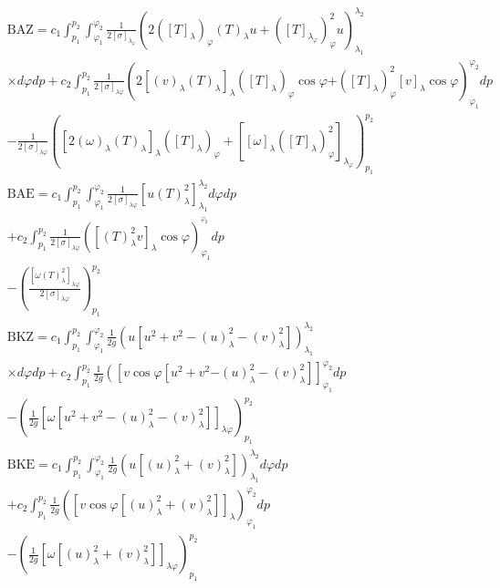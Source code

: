 \begin{align}
& \mathrm{BAZ}=c_1 \int_{p_1}^{p_2} \int_{\varphi_1}^{\varphi_2} \frac{1}{2[\sigma]_{\lambda_{\varphi}}}\left(2\left([T]_\lambda\right)_{\varphi}(T)_\lambda u+\left([T]_{\lambda_{\varphi}}\right)_{\varphi}^2 u\right)_{\lambda_1}^{\lambda_2} \nonumber \\
& \times d \varphi d p+c_2 \int_{p_1}^{p_2} \frac{1}{2[\sigma]_{\lambda \varphi}}\left(2\left[(v)_\lambda(T)_\lambda\right]_\lambda\left([T]_\lambda\right)_{\varphi} \cos \varphi \right. \left.+\left([T]_\lambda\right)_{\varphi}^2[v]_\lambda \cos \varphi\right)_{\varphi_1}^{\varphi_2} d p \nonumber \\
& -\frac{1}{2[\sigma]_{\lambda \varphi}}\left(\left[2(\omega)_\lambda(T)_\lambda\right]_\lambda\left([T]_\lambda\right)_{\varphi}+\left[[\omega]_\lambda\left([T]_\lambda\right)_{\varphi}^2\right]_{\lambda_{\varphi}}\right)_{p_1}^{p_2} \\
& \mathrm{BAE}=c_1 \int_{p_1}^{p_2} \int_{\varphi_1}^{\varphi_2} \frac{1}{2[\sigma]_{\lambda \varphi}}\left[u(T)_\lambda^2\right]_{\lambda_1}^{\lambda_2} d \varphi d p \nonumber \\
& +c_2 \int_{p_1}^{p_2} \frac{1}{2[\sigma]_{\lambda \varphi}}\left(\left[(T)_\lambda^2 v\right]_\lambda \cos \varphi\right)_{\varphi_1}^{^{\varphi_2}} d p \\
& -\left(\frac{\left[\omega(T)_\lambda^2\right]_{\lambda \varphi}}{2[\sigma]_{\lambda \varphi}}\right)_{p_1}^{p_2} \nonumber \\
& \mathrm{BKZ}=c_1 \int_{p_1}^{p_2} \int_{\varphi_1}^{\varphi_2} \frac{1}{2 g}\left(u\left[u^2+v^2-(u)_\lambda^2-(v)_\lambda^2\right]\right)_{\lambda_1}^{\lambda_2} \nonumber \\
& \times d \varphi d p+c_2 \int_{p_1}^{p_2} \frac{1}{2 g}\left(\left[v \cos \varphi \left[u^2+v^2\right.\right.\right. \left.\left.-(u)_\lambda^2-(v)_\lambda^2\right]\right]_{\varphi_1}^{\varphi_2} d p  \\
& -\left(\frac{1}{2 g}\left[\omega\left[u^2+v^2-(u)_\lambda^2-(v)_\lambda^2\right]\right]_{\lambda \varphi}\right)_{p_1}^{p_2} \nonumber \\
& \mathrm{BKE}=c_1 \int_{p_1}^{p_2} \int_{\varphi_1}^{\varphi_2} \frac{1}{2 g}\left(u\left[(u)_\lambda^2+(v)_\lambda^2\right]\right)_{\lambda_1}^{\lambda_2} d \varphi d p \nonumber \\
& +c_2 \int_{p_1}^{p_2} \frac{1}{2 g}\left(\left[v \cos \varphi\left[(u)_\lambda^2+(v)_\lambda^2\right]\right]_\lambda\right)_{\varphi_1}^{\varphi_2} d p \\
& -\left(\frac{1}{2 g}\left[\omega\left[(u)_\lambda^2+(v)_\lambda^2\right]\right]_{\lambda \varphi}\right)_{p_1}^{p_2} \nonumber
\end{align}

